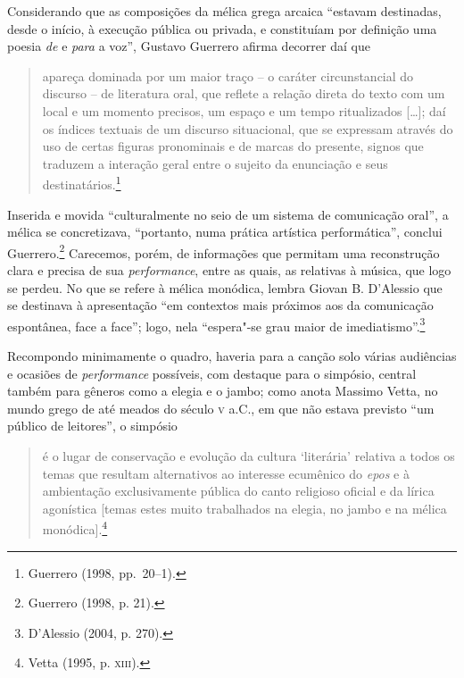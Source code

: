 Considerando que as composições da mélica grega arcaica “estavam destinadas,
desde o início, à execução pública ou privada, e constituíam por definição uma
poesia \textit{de} e \textit{para} a voz”, Gustavo Guerrero
afirma decorrer daí que

\begin{quote}
apareça dominada por um maior traço -- o caráter circunstancial do discurso -- de
literatura oral, que reflete a relação direta do texto com um local e um
momento precisos, um espaço e um tempo ritualizados [\ldots{}]; daí os índices
textuais de um discurso situacional, que se expressam através do uso de certas
figuras pronominais e de marcas do presente, signos que traduzem a interação
geral entre o sujeito da enunciação e seus destinatários.\footnote{ Guerrero (1998, pp.~20--1).}
\end{quote}

Inserida e movida “culturalmente no seio de um sistema de comunicação oral”, a
mélica se concretizava, “portanto, numa prática artística performática”,
conclui Guerrero.\footnote{ Guerrero (1998, p. 21).} Carecemos, porém, de informações que permitam uma
reconstrução clara e precisa de sua \textit{performance}, entre as quais, as
relativas à música, que logo se perdeu. No que se refere à mélica monódica,
lembra Giovan B. D’Alessio que se destinava à apresentação “em
contextos mais próximos aos da comunicação espontânea, face a face”; logo, nela
“espera"-se grau maior de imediatismo”.\footnote{ D’Alessio (2004, p. 270).} 

Recompondo minimamente o quadro, haveria para a canção solo várias audiências e
ocasiões de \textit{performance} possíveis, com destaque para o simpósio,
central também para gêneros como a elegia e o jambo; como anota Massimo Vetta,
no mundo grego de até meados do século \textsc{v} a.C., em que não
estava previsto “um público de leitores”, o simpósio 

\begin{quote}
é o lugar de conservação
e evolução da cultura ‘literária’ relativa a todos os temas que resultam
alternativos ao interesse ecumênico do \textit{epos} e à ambientação
exclusivamente pública do canto religioso oficial e da lírica agonística
[temas estes muito trabalhados na elegia, no jambo e na mélica monódica].\footnote{ Vetta (1995, p. \textsc{xiii}).}
\end{quote}

